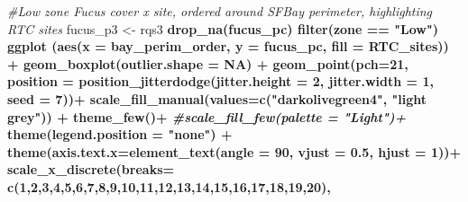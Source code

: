 \documentclass[
]{article}
\newenvironment{Shaded}{\begin{snugshade}}{\end{snugshade}}
\newcommand{\CommentTok}[1]{\textcolor[rgb]{0.56,0.35,0.01}{\textit{#1}}}
\newcommand{\DataTypeTok}[1]{\textcolor[rgb]{0.13,0.29,0.53}{#1}}
\newcommand{\DecValTok}[1]{\textcolor[rgb]{0.00,0.00,0.81}{#1}}
\newcommand{\FloatTok}[1]{\textcolor[rgb]{0.00,0.00,0.81}{#1}}
\newcommand{\KeywordTok}[1]{\textcolor[rgb]{0.13,0.29,0.53}{\textbf{#1}}}
\newcommand{\NormalTok}[1]{#1}
\newcommand{\OperatorTok}[1]{\textcolor[rgb]{0.81,0.36,0.00}{\textbf{#1}}}
\newcommand{\OtherTok}[1]{\textcolor[rgb]{0.56,0.35,0.01}{#1}}
\newcommand{\StringTok}[1]{\textcolor[rgb]{0.31,0.60,0.02}{#1}}
\begin{document}
\begin{Shaded}
\begin{Highlighting}[]
\CommentTok{#Low zone Fucus cover x site, ordered around SFBay perimeter, highlighting RTC sites}
\NormalTok{fucus_p3 <-}\StringTok{ }\NormalTok{rqs3 }\OperatorTok{%>%}\StringTok{ }
\StringTok{  }\KeywordTok{drop_na}\NormalTok{(fucus_pc) }\OperatorTok{%>%}\StringTok{ }
\StringTok{  }\KeywordTok{filter}\NormalTok{(zone }\OperatorTok{==}\StringTok{ "Low"}\NormalTok{) }\OperatorTok{%>%}\StringTok{ }
\StringTok{  }\KeywordTok{ggplot}\NormalTok{ (}\KeywordTok{aes}\NormalTok{(}\DataTypeTok{x =}\NormalTok{ bay_perim_order, }\DataTypeTok{y =}\NormalTok{ fucus_pc, }\DataTypeTok{fill =}\NormalTok{ RTC_sites)) }\OperatorTok{+}
\StringTok{  }\KeywordTok{geom_boxplot}\NormalTok{(}\DataTypeTok{outlier.shape =} \OtherTok{NA}\NormalTok{) }\OperatorTok{+}
\StringTok{  }\KeywordTok{geom_point}\NormalTok{(}\DataTypeTok{pch=}\DecValTok{21}\NormalTok{, }\DataTypeTok{position =} \KeywordTok{position_jitterdodge}\NormalTok{(}\DataTypeTok{jitter.height =} \DecValTok{2}\NormalTok{, }\DataTypeTok{jitter.width =} \DecValTok{1}\NormalTok{, }\DataTypeTok{seed =} \DecValTok{7}\NormalTok{))}\OperatorTok{+}
\StringTok{  }\KeywordTok{scale_fill_manual}\NormalTok{(}\DataTypeTok{values=}\KeywordTok{c}\NormalTok{(}\StringTok{"darkolivegreen4"}\NormalTok{, }\StringTok{"light grey"}\NormalTok{)) }\OperatorTok{+}
\StringTok{  }\KeywordTok{theme_few}\NormalTok{()}\OperatorTok{+}
\StringTok{  }\CommentTok{#scale_fill_few(palette = "Light")+}
\StringTok{  }\KeywordTok{theme}\NormalTok{(}\DataTypeTok{legend.position =} \StringTok{"none"}\NormalTok{) }\OperatorTok{+}
\StringTok{  }\KeywordTok{theme}\NormalTok{(}\DataTypeTok{axis.text.x=}\KeywordTok{element_text}\NormalTok{(}\DataTypeTok{angle =} \DecValTok{90}\NormalTok{, }\DataTypeTok{vjust =} \FloatTok{0.5}\NormalTok{, }\DataTypeTok{hjust =} \DecValTok{1}\NormalTok{))}\OperatorTok{+}
\StringTok{  }\KeywordTok{scale_x_discrete}\NormalTok{(}\DataTypeTok{breaks=} \KeywordTok{c}\NormalTok{(}\DecValTok{1}\NormalTok{,}\DecValTok{2}\NormalTok{,}\DecValTok{3}\NormalTok{,}\DecValTok{4}\NormalTok{,}\DecValTok{5}\NormalTok{,}\DecValTok{6}\NormalTok{,}\DecValTok{7}\NormalTok{,}\DecValTok{8}\NormalTok{,}\DecValTok{9}\NormalTok{,}\DecValTok{10}\NormalTok{,}\DecValTok{11}\NormalTok{,}\DecValTok{12}\NormalTok{,}\DecValTok{13}\NormalTok{,}\DecValTok{14}\NormalTok{,}\DecValTok{15}\NormalTok{,}\DecValTok{16}\NormalTok{,}\DecValTok{17}\NormalTok{,}\DecValTok{18}\NormalTok{,}\DecValTok{19}\NormalTok{,}\DecValTok{20}\NormalTok{), }
}}}
\end{Highlighting}
\end{Shaded}
\end{document}
